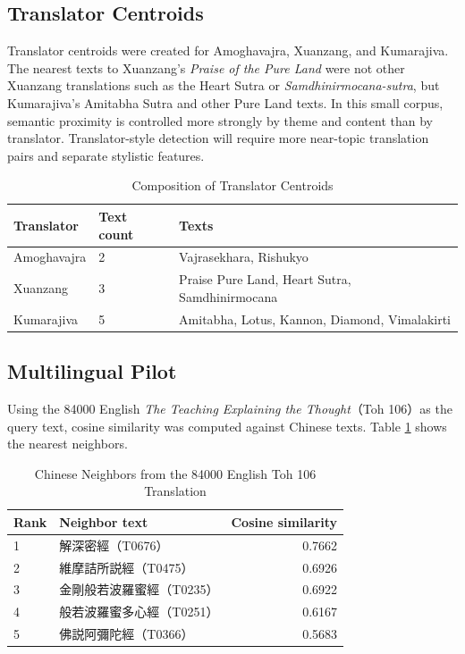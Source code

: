 \documentclass[uplatex,dvipdfmx,11pt,a4paper]{jsarticle}
\begin{document}
\subsection{Translator Centroids}

Translator centroids were created for Amoghavajra, Xuanzang, and Kumarajiva. The nearest texts to Xuanzang's \textit{Praise of the Pure Land} were not other Xuanzang translations such as the Heart Sutra or \textit{Samdhinirmocana-sutra}, but Kumarajiva's Amitabha Sutra and other Pure Land texts. In this small corpus, semantic proximity is controlled more strongly by theme and content than by translator. Translator-style detection will require more near-topic translation pairs and separate stylistic features.

\begin{table}[H]
\centering
\caption{Composition of Translator Centroids}
\begin{tabular}{lll}
\toprule
Translator & Text count & Texts \\
\midrule
Amoghavajra & 2 & Vajrasekhara, Rishukyo \\
Xuanzang & 3 & Praise Pure Land, Heart Sutra, Samdhinirmocana \\
Kumarajiva & 5 & Amitabha, Lotus, Kannon, Diamond, Vimalakirti \\
\bottomrule
\end{tabular}
\end{table}

\subsection{Multilingual Pilot}

Using the 84000 English \textit{The Teaching Explaining the Thought}（Toh 106）as the query text, cosine similarity was computed against Chinese texts. Table \ref{tab:multilingual-pilot} shows the nearest neighbors.

\begin{table}[H]
\centering
\caption{Chinese Neighbors from the 84000 English Toh 106 Translation}
\label{tab:multilingual-pilot}
\begin{tabular}{llr}
\toprule
Rank & Neighbor text & Cosine similarity \\
\midrule
1 & 解深密經（T0676） & 0.7662 \\
2 & 維摩詰所説經（T0475） & 0.6926 \\
3 & 金剛般若波羅蜜經（T0235） & 0.6922 \\
4 & 般若波羅蜜多心經（T0251） & 0.6167 \\
5 & 佛説阿彌陀經（T0366） & 0.5683 \\
\bottomrule
\end{tabular}
\end{table}
\end{document}
